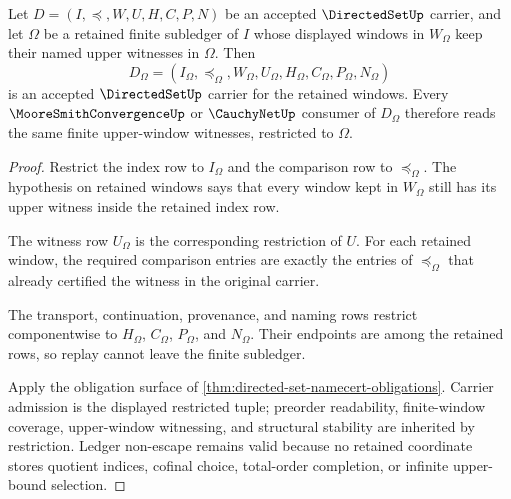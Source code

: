 \begin{theorem}
\label{thm:directed-set-finite-upper-window-stability}
Let $D=(I,\preceq,W,U,H,C,P,N)$ be an accepted $\DirectedSetUp$ carrier, and let $\Omega$ be a retained finite subledger of $I$ whose displayed windows in $W_{\Omega}$ keep their named upper witnesses in $\Omega$. Then
$$
D_{\Omega}=(I_{\Omega},\preceq_{\Omega},W_{\Omega},U_{\Omega},H_{\Omega},C_{\Omega},P_{\Omega},N_{\Omega})
$$
is an accepted $\DirectedSetUp$ carrier for the retained windows. Every $\MooreSmithConvergenceUp$ or $\CauchyNetUp$ consumer of $D_{\Omega}$ therefore reads the same finite upper-window witnesses, restricted to $\Omega$.
\end{theorem}
\begin{proof}
Restrict the index row to $I_{\Omega}$ and the comparison row to $\preceq_{\Omega}$. The hypothesis on retained windows says that every window kept in $W_{\Omega}$ still has its upper witness inside the retained index row.

The witness row $U_{\Omega}$ is the corresponding restriction of $U$. For each retained window, the required comparison entries are exactly the entries of $\preceq_{\Omega}$ that already certified the witness in the original carrier.

The transport, continuation, provenance, and naming rows restrict componentwise to $H_{\Omega}$, $C_{\Omega}$, $P_{\Omega}$, and $N_{\Omega}$. Their endpoints are among the retained rows, so replay cannot leave the finite subledger.

Apply the obligation surface of \autoref{thm:directed-set-namecert-obligations}. Carrier admission is the displayed restricted tuple; preorder readability, finite-window coverage, upper-window witnessing, and structural stability are inherited by restriction. Ledger non-escape remains valid because no retained coordinate stores quotient indices, cofinal choice, total-order completion, or infinite upper-bound selection.
\end{proof}

